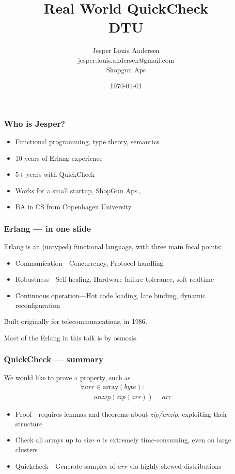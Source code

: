 \documentclass[lualatex]{beamer}
\author{Jesper Louis Andersen\\jesper.louis.andersen@gmail.com\\Shopgun Aps}
\date{\today{}}
\title{Real World QuickCheck\\DTU}
\begin{document}
\maketitle

\begin{frame}
\frametitle{Who is Jesper?}
\begin{itemize}
\item Functional programming, type theory, semantics
\item 10 years of Erlang experience
\item 5+ years with QuickCheck
\item Works for a small startup, ShopGun Aps.,
\item BA in CS from Copenhagen University
\end{itemize}
\end{frame}

\begin{frame}
\frametitle{Erlang — in one slide}
Erlang is an (untyped) functional language, with three main focal points:
\begin{itemize}
\item Communication—Concurrency, Protocol handling
\item Robustness—Self-healing, Hardware failure tolerance, soft-realtime
\item Continuous operation—Hot code loading, late binding, dynamic reconfiguration
\end{itemize}

Built originally for telecommunications, in 1986.

Most of the Erlang in this talk is by osmosis.
\end{frame}

\begin{frame}[fragile]
\frametitle{QuickCheck — summary}
We would like to prove a property, such as
\begin{equation}
\begin{split}
	\forall arr \in \text{array}(byte) :\\
	\quad \quad unzip(zip(arr)) = arr
\end{split}
\end{equation}
\begin{itemize}
\item Proof—requires lemmas and theorems about \emph{zip/unzip}, exploiting their structure
\item Check all arrays up to size $n$ is extremely time-consuming, even on large clusters
\item Quickcheck—Generate samples of $arr$ via highly skewed distributions
\end{itemize}
\end{frame}
\end{document}

